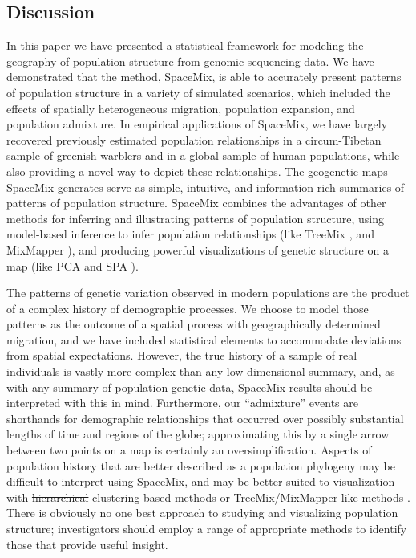 \documentclass[10pt,letterpaper]{article}
\providecommand{\DIFadd}[1]{{\protect\color{blue}\uwave{#1}}} %
\providecommand{\DIFdel}[1]{{\protect\color{red}\sout{#1}}}                      %
\providecommand{\DIFaddbegin}{} %
\providecommand{\DIFaddend}{} %
\providecommand{\DIFdelbegin}{} %
\providecommand{\DIFdelend}{} %
\begin{document}
\subsection*{Discussion}
In this paper we have presented a statistical framework for modeling the geography of population structure from genomic sequencing data.
We have demonstrated that the method, SpaceMix, is able to accurately present patterns of population structure in a variety of simulated scenarios, which included the effects of \DIFaddbegin \DIFadd{uneven sampling, }\DIFaddend spatially heterogeneous migration, population expansion, and population admixture.  In empirical applications of SpaceMix, we have largely recovered previously estimated population relationships in a circum-Tibetan sample of greenish warblers and in a global sample of human populations, while also providing a novel way to depict these relationships.  The geogenetic maps SpaceMix generates serve as simple, intuitive, and information-rich summaries of patterns of population structure. 
SpaceMix combines the advantages of other methods for inferring and illustrating patterns of population structure, 
using model-based inference to infer population relationships (like TreeMix \cite{Treemix}, and MixMapper \cite{lipson_mixmapper_2013}), 
and producing powerful visualizations of genetic structure on a map (like PCA \cite{Patterson2006} and SPA \cite{yang_spatial_2014}).

The patterns of genetic variation observed in modern populations are the product of a complex history of demographic processes.  We choose to model those patterns as the outcome of a spatial process with geographically determined migration,
and we have included statistical elements to accommodate deviations from spatial expectations.
However, the true history of a sample of real individuals is vastly more complex than any low-dimensional summary,
and, as with any summary of population genetic data, 
SpaceMix results should be interpreted with this in mind.
Furthermore, our ``admixture'' events are shorthands for demographic relationships
that occurred over possibly substantial lengths of time and regions of the globe;
approximating this by a single arrow between two points on a map is certainly an oversimplification.
Aspects of population history that are better described as a population phylogeny may be difficult to interpret using SpaceMix,
and may be better suited to visualization with \DIFdelbegin \DIFdel{hierarchical }\DIFdelend \DIFaddbegin \DIFadd{model-based }\DIFaddend clustering-based methods \cite{STRUCTURE} or TreeMix/MixMapper-like methods \cite{Treemix,lipson_mixmapper_2013}.  
There is obviously no one best approach to studying and visualizing population structure;
investigators should employ a range of appropriate methods to identify those that provide useful insight. 
\end{document}
